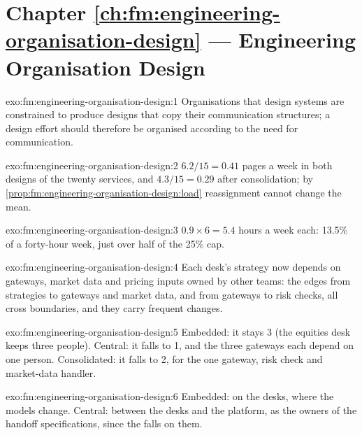 \section*{Chapter \ref{ch:fm:engineering-organisation-design} --- Engineering Organisation Design}

\begin{solution}{exo:fm:engineering-organisation-design:1}
Organisations that design systems are constrained to produce designs that copy their communication structures; a design effort should therefore
be organised according to the need for communication.
\end{solution}

\begin{solution}{exo:fm:engineering-organisation-design:2}
$6.2/15=0.41$ pages a week in both designs of the twenty services, and $4.3/15=0.29$ after consolidation; by
\cref{prop:fm:engineering-organisation-design:load} reassignment cannot change the mean.
\end{solution}

\begin{solution}{exo:fm:engineering-organisation-design:3}
$0.9\times6=5.4$ hours a week each: 13.5\% of a forty-hour week, just over half of the 25\% cap.
\end{solution}

\begin{solution}{exo:fm:engineering-organisation-design:4}
Each desk's strategy now depends on gateways, market data and pricing inputs owned by other teams: the edges from strategies to gateways and
market data, and from gateways to risk checks, all cross boundaries, and they carry frequent changes.
\end{solution}

\begin{solution}{exo:fm:engineering-organisation-design:5}
Embedded: it stays 3 (the equities desk keeps three people). Central: it falls to 1, and the three gateways each depend on one person.
Consolidated: it falls to 2, for the one gateway, risk check and market-data handler.
\end{solution}

\begin{solution}{exo:fm:engineering-organisation-design:6}
Embedded: on the desks, where the models change. Central: between the desks and the platform, as the owners of the handoff specifications, since
the  falls on them.
\end{solution}

